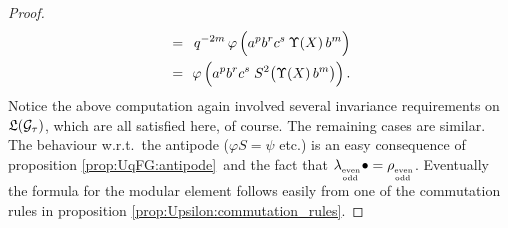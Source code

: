 \begin{proof}
\begin{eqnarray*}
&=\!\!&
    q^{-2m} \, \varphi\left(a^p  b^r c^s \: \Upsilon(X) \, b^m \vertL\right) \\
&=\!\!&
\varphi\left(a^p  b^r c^s \; S^2\!\left(\Upsilon(X) \, b^m \vertM \right) \! \vertL \right).
\end{eqnarray*}
Notice the above computation again involved several invariance requirements on
$\mathfrak{L}(\mathcal G_\tau)$, which are all satisfied here, of course. The remaining cases are similar.
The behaviour w.r.t.\ the antipode ($\varphi S = \psi$ etc.)
is an easy consequence of proposition \ref{prop:UqFG:antipode}\ and the fact that
$\lambda_{_{\stackrel{\scriptscriptstyle \rm even}{\scriptscriptstyle \! \rm odd}}} \bullet = \rho_{_{\stackrel{\scriptscriptstyle \rm even}{\scriptscriptstyle \! \rm odd}}}$.
Eventually the formula for the modular element follows easily from one of the
commutation rules in proposition \ref{prop:Upsilon:commutation_rules}.
\end{proof}
